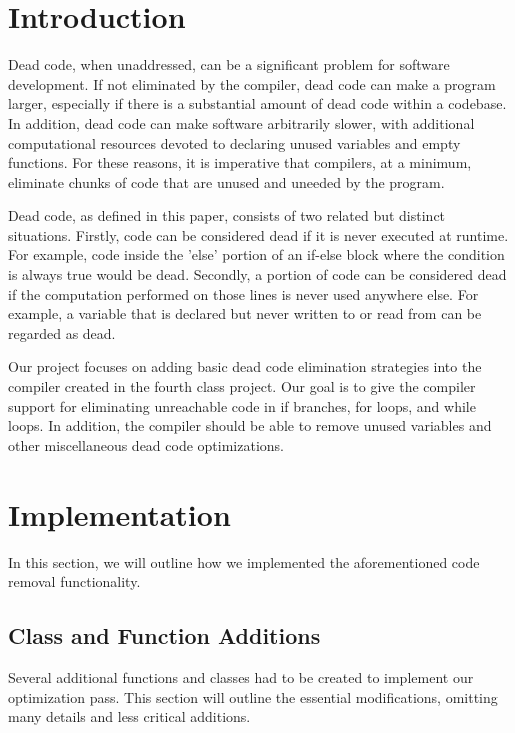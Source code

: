 \documentclass[sigconf]{acmart}
\begin{document}
\maketitle

\section{Introduction}
Dead code, when unaddressed, can be a significant problem for software development.
If not eliminated by the compiler, dead code can make a program 
larger, especially if there is a substantial amount of dead code within a codebase. In addition, dead code 
can make software arbitrarily slower, with additional computational resources devoted 
to declaring unused variables and empty functions. For these reasons, it is imperative that compilers, at 
a minimum, eliminate chunks of code that are unused and uneeded by the program.

Dead code, as defined in this paper, consists of 
two related but distinct situations. Firstly, code can be considered dead if 
it is never executed at runtime. For example, code inside the 'else' portion 
of an if-else block where the condition is always true would be dead. Secondly, a portion of 
code can be considered dead if the computation performed on those lines is never used anywhere else.
For example, a variable that is declared but never written to or read from can be regarded as dead. 

Our project focuses on adding basic dead code elimination strategies into the compiler 
created in the fourth class project. Our goal is to give the compiler support for eliminating
unreachable code in if branches, for loops, and while loops. In addition, the compiler should 
be able to remove unused variables and other miscellaneous dead code optimizations. 

\section{Implementation}
In this section, we will outline how we implemented the aforementioned code removal functionality.

\subsection{Class and Function Additions}
Several additional functions and classes had to be created to implement our optimization pass.
This section will outline the essential modifications, omitting many details and less critical additions.
\end{document}
